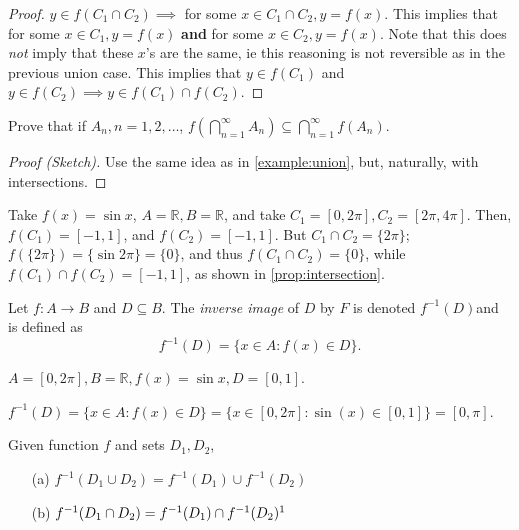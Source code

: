 \documentclass[12pt]{article}
\begin{document}
\begin{proof}[Proof]
  $y \in f(C_1 \cap C_2) \implies$ for some $x \in C_1 \cap C_2, y = f(x)$. This implies that for some $x \in C_1, y = f(x)$ \textbf{and} for some $x \in C_2, y = f(x)$. Note that this does \textit{not} imply that these $x$'s are the same, ie this reasoning is not reversible as in the previous union case. This implies that $y \in f(C_1)$ and $y \in f(C_2) \implies y \in f(C_1) \cap f(C_2)$.
\end{proof}

\begin{example}
  Prove that if $A_n, n = 1, 2, \dots$, $f(\bigcap_{n=1}^{\infty} A_n) \subseteq \bigcap_{n=1}^{\infty}f(A_n)$.
  \begin{proof}[Proof (Sketch)]
    Use the same idea as in \cref{example:union}, but, naturally, with intersections.
  \end{proof}
\end{example}

\begin{example}
  Take $f(x) = \sin x$, $A = \mathbb{R}, B = \mathbb{R}$, and take $C_1 = [0, 2 \pi], C_2 = [2 \pi, 4 \pi]$. Then, $f(C_1) = [-1,1]$, and $f(C_2) = [-1,1]$. But $C_1 \cap C_2 = \{2 \pi\}$; $f(\{2 \pi\}) = \{\sin 2 \pi\} = \{0\}$, and thus $f(C_1 \cap C_2) = \{0\}$, while $f(C_1) \cap f(C_2) = [-1,1]$, as shown in \cref{prop:intersection}.
\end{example}

\begin{definition}
  Let $f: A \to B$ and $D \subseteq B$. The \emph{inverse image} of $D$ by $F$ is denoted $f^{-1}(D)$\footnotemark and is defined as \[f^{-1}(D) = \{x \in A : f(x) \in D\}.\]
\end{definition}
\begin{example}
  $A = [0, 2 \pi], B = \mathbb{R}, f(x) = \sin x, D = [0,1]$. 
  
  $f^{-1}(D) = \{x \in A: f(x) \in D\} = \{x \in [0, 2 \pi] : \sin(x) \in [0,1]\} = [0,\pi]$.
\end{example}

\begin{proposition}\label{prop:intersectionsimple}
  Given function $f$ and sets $D_1, D_2$,
  \begin{itemize}
    \item[(a)] $f^{-1}(D_1 \cup D_2) = f^{-1}(D_1) \cup f^{-1}(D_2)$
    \item[(b)] $f^{-1}(D_1 \cap D_2) = f^{-1}(D_1) \cap f^{-1}(D_2)\footnotemark$ 
  \end{itemize}
\end{proposition}
\end{document}
